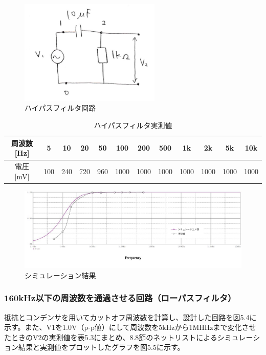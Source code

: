 \documentclass{jlreq}
\numberwithin{equation}{section}
\begin{document}
\begin{figure}[H]
  \centering
  \includegraphics[width=0.6\textwidth]{assets/highpasskairo.png}
  \caption{ハイパスフィルタ回路}
\end{figure}

\begin{table}[H]
  \centering
  \caption{ハイパスフィルタ実測値}
  \begin{tabular}{|c|c|c|c|c|c|c|c|c|c|c|c|}
    \hline
    周波数 [Hz] & 5 & 10 & 20 & 50 & 100 & 200 & 500 & 1k & 2k & 5k & 10k \\ \hline
    電圧 [mV] & 100 & 240 & 720 & 960 & 1000 & 1000 & 1000 & 1000 & 1000 & 1000 & 1000 \\ \hline
  \end{tabular}
\end{table}

\begin{figure}[H]
  \centering
  \includegraphics[width=\textwidth]{assets/highpass.jpg}
  \caption{シミュレーション結果}
\end{figure}

\subsubsection{160kHz以下の周波数を通過させる回路（ローパスフィルタ）}
抵抗とコンデンサを用いてカットオフ周波数を計算し、設計した回路を図5.4に示す。また、V1を1.0V（p-p値）にして周波数を5kHzから1MHHzまで変化させたときのV2の実測値を表5.3にまとめ、8.8節のネットリストによるシミュレーション結果と実測値をプロットしたグラフを図5.5に示す。
\end{document}
